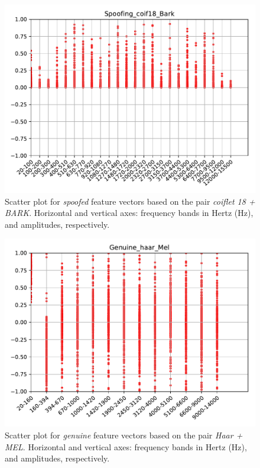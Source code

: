 		\begin{figure}[H]
			\centering
			\includegraphics[scale=.7]{images/results/barkVersusMel/Spoofing_coif18_Bark.pdf}
			\caption{Scatter plot for \textit{spoofed} feature vectors based on the pair \textit{coiflet 18 + BARK}. Horizontal and vertical axes: frequency bands in Hertz (Hz), and amplitudes, respectively.}
			\label{fig:spoofingcoif18bark}
		\end{figure}
		\begin{figure}[H]
			\centering
			\includegraphics[scale=.7]{images/results/barkVersusMel/Genuine_haar_Mel.pdf}
			\caption{Scatter plot for \textit{genuine} feature vectors based on the pair \textit{Haar + MEL}. Horizontal and vertical axes: frequency bands in Hertz (Hz), and amplitudes, respectively.}
			\label{fig:livehaarmel}
		\end{figure}
